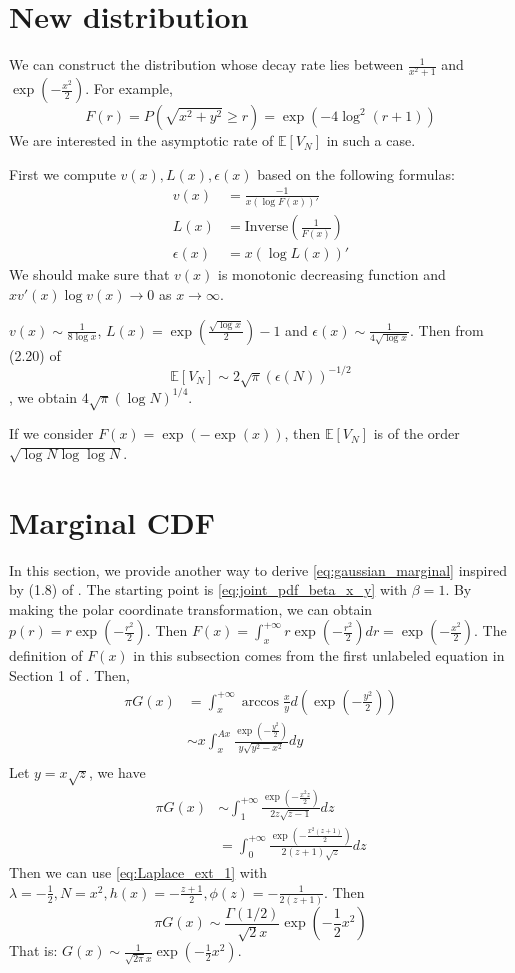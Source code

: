 \documentclass{article}
\def\E{\mathbb{E}}
\begin{document}
\section{New distribution}
We can construct the distribution
whose decay rate lies between $\frac{1}{x^2+1}$
and $\exp(-\frac{x^2}{2})$. For example,
\begin{equation}
    F(r)= P(\sqrt{x^2+y^2} \geq r)
    = \exp(-4\log^2 (r+1))
\end{equation}
We are interested in the asymptotic rate of $\E[V_N]$
in such a case.

First we compute $v(x), L(x), \epsilon(x)$
based on the following formulas:
\begin{align*}
v(x) &= \frac{-1}{x (\log F(x))'} \\ 
L(x)  & = \textrm{Inverse}(\frac{1}{F(x)}) \\
\epsilon(x) &= x (\log L(x))'
\end{align*}
We should make sure that $v(x)$ is monotonic decreasing function
and $x v'(x) \log v(x) \to 0$ as $x\to \infty$.

$v(x) \sim \frac{1}{8 \log x}$, $L(x)
= \exp(\frac{\sqrt{\log x}}{2})- 1$
and $\epsilon(x) \sim \frac{1}{4\sqrt{\log x}}$.
Then from (2.20) of \cite{carnal1970konvexe}
$$
\E[V_N] \sim 2\sqrt{\pi} (\epsilon(N))^{-1/2}
$$, 
we obtain $4\sqrt{\pi}(\log N)^{1/4}$.

If we consider $F(x) = \exp(-\exp(x))$,
then $\E[V_N]$ is of the order $\sqrt{\log N \log \log N}$.


\section{Marginal CDF}
In this section, we provide another way to derive
\eqref{eq:gaussian_marginal} inspired by (1.8)
of \cite{carnal1970konvexe}.
The starting point is \eqref{eq:joint_pdf_beta_x_y}
with $\beta=1$. By making the polar coordinate
transformation, we can obtain $p(r)=r\exp(-\frac{r^2}{2})$.
Then $F(x) = \int_x^{+\infty} r\exp(-\frac{r^2}{2})dr=
\exp(-\frac{x^2}{2})$. The definition of $F(x)$
in this subsection comes from the first unlabeled equation
in Section 1 of \cite{carnal1970konvexe}.
Then,
\begin{align*}
    \pi G(x) & = \int_x^{+\infty}
    \arccos \frac{x}{y} d(\exp(-\frac{y^2}{2})) \\
    & \sim x \int_x^{Ax} \frac{\exp(-\frac{y^2}{2})}
    {y\sqrt{y^2-x^2}} dy \\
\end{align*}
Let $y=x\sqrt{z}$, we have
\begin{align*}
    \pi G(x) &\sim \int_1^{+\infty} \frac{\exp(-\frac{x^2z}{2})}
    {2z\sqrt{z-1}} dz \\
    &=\int_0^{+\infty} \frac{\exp(-\frac{x^2(z+1)}{2})}
    {2(z+1)\sqrt{z}} dz
\end{align*}
Then we can use \eqref{eq:Laplace_ext_1} with $\lambda=-\frac{1}{2},
N=x^2, h(x)=-\frac{z+1}{2}, \phi(z)=-\frac{1}{2(z+1)}$.
Then
\begin{equation}
    \pi G(x) \sim \frac{\Gamma(1/2)}{\sqrt{2} x } \exp(-\frac{1}{2}x^2)
\end{equation}
That is: $G(x) \sim \frac{1}{\sqrt{2 \pi} x} \exp(-\frac{1}{2}x^2)$.
\end{document}
